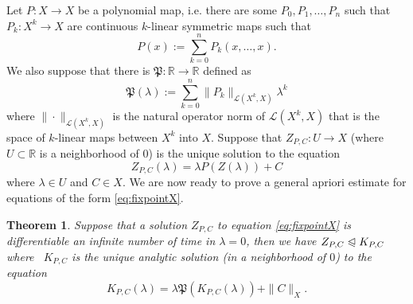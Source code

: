 \documentclass{article}
\newcommand{\assign}{:=}
\newtheorem{theorem}{Theorem}
\begin{document}
Let $P : X \rightarrow X$ be a polynomial map, i.e. there are some $P_0, P_1,
\ldots, P_n$ such that $P_k : X^k \rightarrow X$ are continuous $k$-linear
symmetric maps such that
\[ P (x) \assign \sum_{k = 0}^n P_k (x, \ldots, x) . \]
We also suppose that there is $\mathfrak{P} : \mathbb{R} \rightarrow
\mathbb{R}$ defined as
\[ \mathfrak{P} (\lambda) \assign \sum_{k = 0}^n \| P_k \|_{\mathcal{L} (X^k,
   X)} \lambda^k \]
where $\| \cdot \|_{\mathcal{L} (X^k, X)}$ is the natural operator norm of
$\mathcal{L} (X^k, X)$ that is the space of $k$-linear maps between $X^k$ into
$X$. Suppose that $Z_{P, C} : U \rightarrow X$ (where $U \subset \mathbb{R}$
is a neighborhood of 0) is the unique solution to the equation
\begin{equation}
  Z_{P, C} (\lambda) = \lambda P (Z (\lambda)) + C \label{eq:fixpointX}
\end{equation}
where $\lambda \in U$ and $C \in X$. We are now ready to prove a general
apriori estimate for equations of the form {\eqref{eq:fixpointX}}.

\begin{theorem}
  \label{theorem:aprioriexpansion}Suppose that a solution $Z_{P, C}$ to
  equation {\eqref{eq:fixpointX}} is differentiable an infinite number of time
  in $\lambda = 0$, then we have $Z_{P, C} \trianglelefteqslant K_{P, C}$
  where \ $K_{P, C}$ is the unique analytic solution (in a neighborhood of
  $0$) to the equation
  \begin{equation}
    K_{P, C} (\lambda) = \lambda \mathfrak{P} (K_{P, C} (\lambda)) + \| C \|_X
    . \label{eq:equationflambda}
  \end{equation}
\end{theorem}
\end{document}
